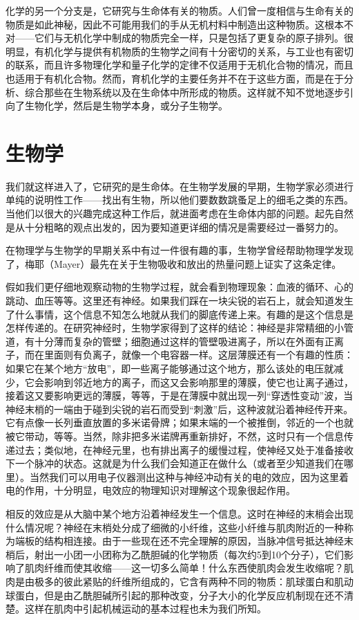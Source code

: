 化学的另一个分支是，它研究与生命体有关的物质。人们曾一度相信与生命有关的物质是如此神秘，因此不可能用我们的手从无机村料中制造出这种物质。这根本不对——它们与无机化学中制成的物质完全一样，只是包括了更复杂的原子排列。很明显，有机化学与提供有机物质的生物学之间有十分密切的关系，与工业也有密切的联系，而且许多物理化学和量子化学的定律不仅适用于无机化合物的情况，而且也适用于有机化合物。然而，育机化学的主要任务并不在于这些方面，而是在于分析、综合那些在生物系统以及在生命体中所形成的物质。这样就不知不觉地逐步引向了生物化学，然后是生物学本身，或分子生物学。


\section{生物学}

我们就这样进入了，它研究的是生命体。在生物学发展的早期，生物学家必须进行单纯的说明性工作——找出有生物，所以他们要数数跳蚤足上的细毛之类的东西。当他们以很大的兴趣完成这种工作后，就进面考虑在生命体内部的问题。起先自然是从十分粗略的观点出发的，因为要知道更详细的情况是需要经过一番努力的。

在物理学与生物学的早期关系中有过一件很有趣的事，生物学曾经帮助物理学发现了，梅耶（Mayer）最先在关于生物吸收和放出的热量问题上证实了这条定律。

假如我们更仔细地观察动物的生物学过程，就会看到物理现象：血液的循环、心的跳动、血压等等。这里还有神经。如果我们踩在一块尖锐的岩石上，就会知道发生了什么事情，这个信息不知怎么地就从我们的脚底传递上来。有趣的是这个信息是怎样传递的。在研究神经时，生物学家得到了这样的结论：神经是非常精细的小管道，有十分薄而复杂的管壁；细胞通过这样的管壁吸进离子，所以在外面有正离子，而在里面则有负离子，就像一个电容器一样。这层薄膜还有一个有趣的性质：如果它在某个地方“放电”，即一些离子能够通过这个地方，那么该处的电压就减少，它会影响到邻近地方的离子，而这又会影响那里的薄膜，使它也让离子通过，接着这又要影响更远的薄膜，等等，于是在薄膜中就出现一列“穿透性变动”波，当神经末梢的一端由于碰到尖锐的岩石而受到“刺激”后，这种波就沿着神经传开来。它有点像一长列垂直放置的多米诺骨牌；如果末端的一个被推倒，邻近的一个也就被它带动，等等。当然，除非把多米诺牌再重新排好，不然，这时只有一个信息传递过去；类似地，在神经元里，也有排出离子的缓慢过程，使神经又处于准备接收下一个脉冲的状态。这就是为什么我们会知道正在做什么（或者至少知道我们在哪里）。当然我们可以用电子仪器测出这种与神经冲动有关的电的效应，因为这里着电的作用，十分明显，电效应的物理知识对理解这个现象很起作用。

相反的效应是从大脑中某个地方沿着神经发生一个信息。这时在神经的末梢会出现什么情况呢？神经在末梢处分成了细微的小纤维，这些小纤维与肌肉附近的一种称为端板的结构相连接。由于一些现在还不完全理解的原因，当脉冲信号抵达神经末梢后，射出一小团一小团称为乙酰胆碱的化学物质（每次约5到10个分子），它们影响了肌肉纤维而使其收缩——这一切多么简单！什么东西使肌肉会发生收缩呢？肌肉是由极多的彼此紧贴的纤维所组成的，它含有两种不同的物质：肌球蛋白和肌动球蛋白，但是由乙酰胆碱所引起的那种改变，分子大小的化学反应机制现在还不清楚。这样在肌肉中引起机械运动的基本过程也未为我们所知。

